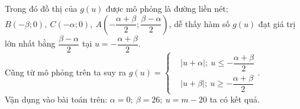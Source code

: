 \begin{ex}
{\begin{center}
\begin{tikzpicture}[>=stealth,scale=1, line join = round, line cap = round]
		\end{tikzpicture}
		\end{center}
		\noindent	Trong đó đồ thị của $g(u)$ được mô phỏng là đường liền nét; 	$B\left(-\beta;0\right),\ C\left(-\alpha;0\right),\ A\left(-\dfrac{\alpha+\beta}{2};\dfrac{\beta-\alpha}{2}\right) $, dễ thấy hàm số $g(u)$ đạt giá trị lớn nhất bằng $\dfrac{\beta-\alpha}{2}$ tại $u=-\dfrac{\alpha+\beta}{2}$.\\
		Cũng từ mô phỏng trên ta suy ra $g(u)=\left\{\begin{aligned}&\left|u+\alpha\right|;\ u\le -\dfrac{\alpha+\beta}{2}\\&\left|u+\beta\right|;\ u\ge -\dfrac{\alpha+\beta}{2}\end{aligned}\right.$.\\
		Vận dụng vào bài toán trên: $\alpha=0;\ \beta=26;\ u=m-20$ ta có kết quả.
	}
\end{ex}
